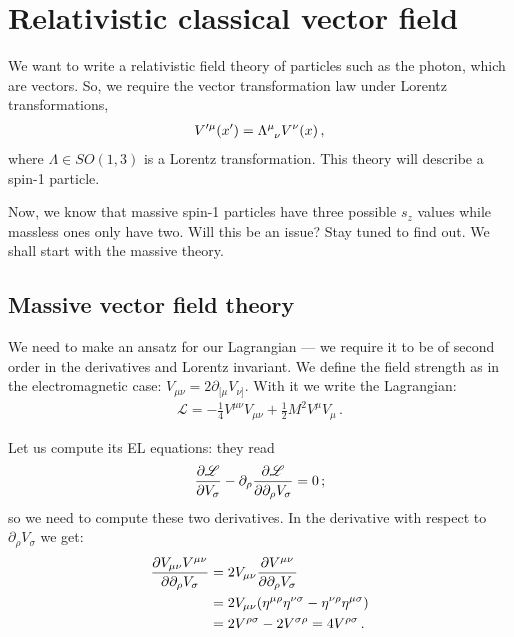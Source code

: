 \documentclass[main.tex]{subfiles}
\begin{document}
\section{Relativistic classical vector field}


We want to write a relativistic field theory of particles such as the photon, which are vectors.
So, we require the vector transformation law under Lorentz transformations, 
%
\begin{align}
V^{\prime \mu } (x') = \tensor{\Lambda }{^{\mu }_{\nu }} V^{\nu } (x)
\,,
\end{align}
%
where \(\Lambda \in SO(1, 3)\) is a Lorentz transformation.
This theory will describe a spin-1 particle. 

Now, we know that massive spin-1 particles have three possible \(s_z\) values while massless ones only have two. Will this be an issue? Stay tuned to find out. We shall start with the massive theory. 

\subsection{Massive vector field theory}

We need to make an ansatz for our Lagrangian --- we require it to be of second order in the derivatives and Lorentz invariant. We define the field strength as in the electromagnetic case: \(V_{\mu \nu } = 2 \partial_{[\mu} V_{\nu ]}\). With it we write the Lagrangian:
%
\begin{align}
\mathscr{L} = - \frac{1}{4}  V^{\mu \nu } V_{\mu \nu } + \frac{1}{2} M^2 V^{\mu }V_{\mu }
\,.
\end{align}

Let us compute its EL equations: they read 
%
\begin{align}
\pdv{\mathscr{L}}{V_{\sigma }} - \partial_{\rho } \pdv{\mathscr{L}}{\partial_{ \rho } V_{\sigma }} = 0
\,;
\end{align}
%
so we need to compute these two derivatives. In the derivative with respect to \(\partial_{\rho } V_{\sigma }\) we get: 
%
\begin{subequations}
\begin{align} \label{eq:derivative-kinetic-term-vector}
\pdv{V_{\mu \nu } V^{\mu \nu }}{\partial_{\rho }V_{\sigma }}
&= 2 V_{\mu \nu } \pdv{V^{\mu \nu }}{\partial_{\rho }V_{\sigma }}  \\
&= 2 V_{\mu \nu }\qty(\eta^{\mu \rho } \eta^{\nu \sigma } - \eta^{\nu \rho } \eta^{\mu \sigma })  \\
&= 2 V^{\rho \sigma } - 2 V^{\sigma \rho } = 4 V^{\rho \sigma }
\,.
\end{align}
\end{subequations}
\end{document}
